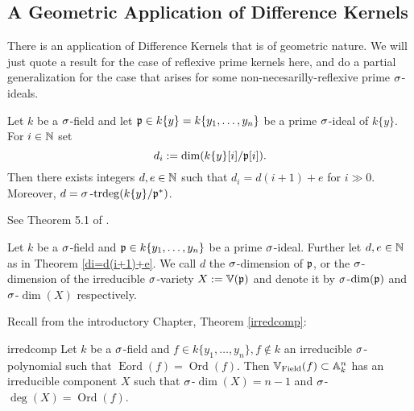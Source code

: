 \subsection{A Geometric Application of Difference Kernels}

There is an application of Difference Kernels that is of geometric nature. We will just quote a result for the case of reflexive prime kernels here,
and do a partial generalization for the case that arises for some non-necesarilly-reflexive prime $\sigma$-ideals.

\begin{theorem}\label{di=d(i+1)+e}
Let $k$ be a $\sigma$-field and let $\mathfrak{p} \in k\{y\} = k\{y_1,\ldots,y_n\}$ be a prime $\sigma$-ideal of $k\{y\}$. For $i \in \mathbb{N}$ set $$d_i := \dim(k\{y\}[i]/\mathfrak{p}[i]).$$
Then there exists integers $d, e \in \mathbb{N}$ such that $d_i = d(i+1) + e$ for $i \gg 0$. Moreover, $d = \sigma\operatorname{-trdeg}(k\{y\}/\mathfrak{p}^*)$.
\begin{bew}
See Theorem 5.1 of \cite{wibmer}.
\end{bew}
\end{theorem}

\begin{defn}
Let $k$ be a $\sigma$-field and $\mathfrak{p} \in k\{y_1,\ldots,y_n\}$ be a prime $\sigma$-ideal. Further let $d, e \in \mathbb{N}$ as in Theorem \ref{di=d(i+1)+e}. We call $d$ the $\sigma$-dimension of $\mathfrak{p}$, 
or the $\sigma$-dimension of the irreducible $\sigma$-variety $X:= \mathbb{V}(\mathfrak{p})$ and denote it by $\sigma$-$\dim(\mathfrak{p})$ and $\sigma$-$\dim(X)$ respectively.
\end{defn}

Recall from the introductory Chapter, Theorem \ref{irredcomp}:
\begin{restatement}{irredcomp}
Let $k$ be a $\sigma$-field and $f \in k\{y_1,\ldots,y_n\}, f \notin k$ an irreducible $\sigma$-polynomial such that $\operatorname{Eord}(f) = \operatorname{Ord}(f)$. Then $\mathbb{V}_{\operatorname{Field}}(f) \subset \mathbb{A}_k^n$ has an irreducible component $X$ such that $\sigma$-$\dim(X) = n-1$ and $\sigma$-$\operatorname{deg}(X) = \operatorname{Ord}(f)$.
\end{restatement}

